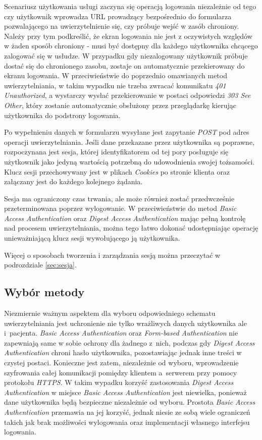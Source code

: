 \documentclass[11pt]{aghdpl}
\begin{document}
Scenariusz użytkowania usługi zaczyna się operacją logowania niezależnie od tego czy użytkownik wprowadza URL prowadzący bezpośrednio do formularza pozwalającego na uwierzytelnienie się, czy próbuje wejść w zasób chroniony. Należy przy tym podkreślić, że ekran logowania nie jest z oczywistych względów w żaden sposób chroniony - musi być dostępny dla każdego użytkownika chcącego zalogować się w usłudze. W przypadku gdy niezalogowany użytkownik próbuje dostać się do chronionego zasobu, zostaje on automatycznie przekierowany do ekranu logowania. W przeciwieństwie do poprzednio omawianych metod uwierzytelniania, w takim wypadku nie trzeba zwracać komunikatu \emph{401 Unauthorized}, a wystarczy wysłać przekierowanie w postaci odpowiedzi \emph{303 See Other}, który zostanie automatycznie obsłużony przez przeglądarkę kierując użytkownika do podstrony logowania.

Po wypełnieniu danych w formularzu wysyłane jest zapytanie \emph{POST} pod adres operacji uwierzytelniania. Jeśli dane przekazane przez użytkownika są poprawne, rozpoczynana jest sesja, której identyfikatorem od tej pory posługuje się użytkownik jako jedyną wartością potrzebną do udowodnienia swojej tożsamości. Klucz sesji przechowywany jest w plikach \emph{Cookies} po stronie klienta oraz załączany jest do każdego kolejnego żądania.

Sesja ma ograniczony czas trwania, ale może również zostać przedwcześnie przeterminowana poprzez wylogowanie. W przeciwieństwie do metod \emph{Basic Access Authentication} oraz \emph{Digest Access Authentication} mając pełną kontrolę nad procesem uwierzytelniania, można tego łatwo dokonać udostępniając operację unieważniającą klucz sesji wywołującego ją użytkownika.

Więcej o sposobach tworzenia i zarządzania sesją można przeczytać w podrozdziale \ref{sec:sesja}.

\subsection{Wybór metody}

Niezmiernie ważnym aspektem dla wyboru odpowiedniego schematu uwierzytelniania jest uchronienie nie tylko wrażliwych danych użytkownika ale i~pacjenta. \emph{Basic Access Authentication} oraz \emph{Form-based Authentication} nie zapewniają same w sobie ochrony dla żadnego z~nich, podczas gdy \emph{Digest Access Authentication} chroni hasło użytkownika, pozostawiając jednak inne treści w czystej postaci. Konieczne jest zatem, niezależnie od wyboru, wprowadzenie szyfrowania całej komunikacji pomiędzy klientem a~serwerem przy pomocy protokołu \emph{HTTPS}. W takim wypadku korzyść zastosowania \emph{Digest Access Authentication} w miejsce \emph{Basic Access Authentication} jest niewielka, ponieważ dane użytkownika będą bezpieczne niezależnie od wyboru. Prostota \emph{Basic Access Authentication} przemawia na jej korzyść, jednak niesie ze sobą wiele ograniczeń takich jak brak możliwości wylogowania oraz implementacji własnego interfejsu logowania.
\end{document}
